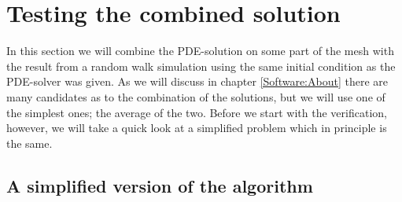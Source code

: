 \section{Testing the combined solution}
In this section we will combine the PDE-solution on some part of the mesh with the result from a random walk simulation using the same initial condition as the PDE-solver was given. 
As we will discuss in chapter \ref{Software:About} there are many candidates as to the combination of the solutions, but we will use one of the simplest ones; the average of the two. 
Before we start with the verification, however, we will take a quick look at a simplified problem which in principle is the same.

\subsection{A simplified version of the algorithm}\label{simplified_test}

